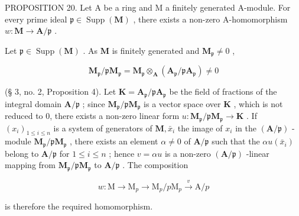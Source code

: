 PROPOSITION 20. Let A be a ring and M a finitely generated A-module. For every prime ideal \(\mathfrak{p} \in \operatorname{Supp}(\mathbf{M})\) , there exists a non-zero A-homomorphism \(w: \mathbf{M} \to \mathbf{A}/\mathfrak{p}\) .

Let \(\mathfrak{p} \in \operatorname{Supp}(\mathbf{M})\) . As \(\mathbf{M}\) is finitely generated and \(\mathbf{M}_{\mathfrak{p}} \neq 0\) ,

\[
\mathbf {M} _ {\mathfrak {p}} / \mathfrak {p} \mathbf {M} _ {\mathfrak {p}} = \mathbf {M} _ {\mathfrak {p}} \otimes_ {\mathbf {A}} (\mathbf {A} _ {\mathfrak {p}} / \mathfrak {p} \mathbf {A} _ {\mathfrak {p}}) \neq 0
\]

(§ 3, no. 2, Proposition 4). Let \(\mathbf{K} = \mathbf{A}_{\mathfrak{p}} / \mathfrak{p}\mathbf{A}_{\mathfrak{p}}\) be the field of fractions of the integral domain \(\mathbf{A} / \mathfrak{p}\) ; since \(\mathbf{M}_{\mathfrak{p}} / \mathfrak{p}\mathbf{M}_{\mathfrak{p}}\) is a vector space over \(\mathbf{K}\) , which is not reduced to 0, there exists a non-zero linear form \(u: \mathbf{M}_{\mathfrak{p}} / \mathfrak{p}\mathbf{M}_{\mathfrak{p}} \to \mathbf{K}\) . If \((x_{i})_{1 \leqslant i \leqslant n}\) is a system of generators of \(\mathbf{M}, \bar{x}_{i}\) the image of \(x_{i}\) in the \((\mathbf{A} / \mathfrak{p})\) -module \(\mathbf{M}_{\mathfrak{p}} / \mathfrak{p}\mathbf{M}_{\mathfrak{p}}\) , there exists an element \(\alpha \neq 0\) of \(\mathbf{A} / \mathfrak{p}\) such that the \(\alpha u(\bar{x}_i)\) belong to \(\mathbf{A} / \mathfrak{p}\) for \(1 \leqslant i \leqslant n\) ; hence \(v = \alpha u\) is a non-zero \((\mathbf{A} / \mathfrak{p})\) -linear mapping from \(\mathbf{M}_{\mathfrak{p}} / \mathfrak{p}\mathbf{M}_{\mathfrak{p}}\) to \(\mathbf{A} / \mathfrak{p}\) . The composition

\[
w: \mathrm{M} \longrightarrow \mathrm{M} _ {p} \longrightarrow \mathrm{M} _ {p} / p \mathrm{M} _ {p} \stackrel {v} {\longrightarrow} \mathrm{A} / p
\]

is therefore the required homomorphism.

